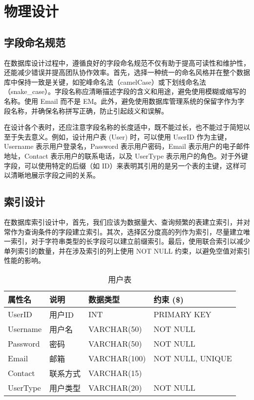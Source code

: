\section{物理设计}

\subsection{字段命名规范}

在数据库设计过程中，遵循良好的字段命名规范不仅有助于提高可读性和维护性，还能减少错误并提高团队协作效率。首先，选择一种统一的命名风格并在整个数据库中保持一致是关键，如驼峰命名法（camelCase）或下划线命名法（snake\_case）。字段名称应清晰描述字段的含义和用途，避免使用模糊或缩写的名称。使用 Email 而不是 EM。此外，避免使用数据库管理系统的保留字作为字段名称，并确保名称拼写正确，防止引起歧义和误解。

在设计各个表时，还应注意字段名称的长度适中，既不能过长，也不能过于简短以至于失去意义。例如，设计用户表 (User) 时，可以使用 UserID 作为主键，Username 表示用户登录名，Password 表示用户密码，Email 表示用户的电子邮件地址，Contact 表示用户的联系电话，以及 UserType 表示用户的角色。对于外键字段，可以使用特定的后缀（如 ID）来表明其引用的是另一个表的主键，这样可以清晰地展示字段之间的关系。

\subsection{索引设计}

在数据库索引设计中，首先，我们应该为数据量大、查询频繁的表建立索引，并对常作为查询条件的字段建立索引。其次，选择区分度高的列作为索引，尽量建立唯一索引，对于字符串类型的长字段可以建立前缀索引。最后，使用联合索引以减少单列索引的数量，并在涉及索引的列上使用 NOT NULL 约束，以避免空值对索引性能的影响。

\begin{table}[!hpt]
    \caption{用户表}
    \label{tab:rela-user}
    \centering
    \begin{tabular}{@{}llll@{}} \toprule
        \textbf{属性名} & \textbf{说明} & \textbf{数据类型} & \textbf{约束} (\$) \\ \midrule
        UserID & 用户ID & INT & PRIMARY KEY \\
        Username & 用户名 & VARCHAR(50) & NOT NULL \\
        Password & 密码 & VARCHAR(50) & NOT NULL \\
        Email & 邮箱 & VARCHAR(100) & NOT NULL, UNIQUE \\
        Contact & 联系方式 & VARCHAR(15) &  \\
        UserType & 用户类型 & VARCHAR(20) & NOT NULL \\ \bottomrule
    \end{tabular}
\end{table}

